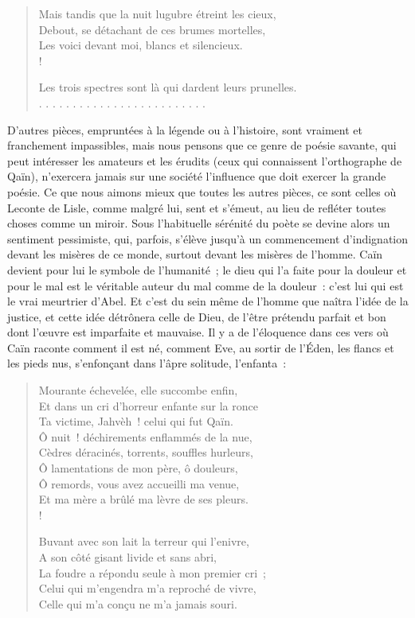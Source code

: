 \documentclass[french,twoside]{book} %
\begin{document}
\begin{verse}
Mais tandis que la nuit lugubre étreint les cieux,\\
Debout, se détachant de ces brumes mortelles,\\
Les voici devant moi, blancs et silencieux.\\!

Les trois spectres sont là qui dardent leurs prunelles.\\
. . . . . . . . . . . . . . . . . . . . . . . . .\\
\end{verse}

\noindent D’autres pièces, empruntées à la légende ou à l’histoire, sont vraiment et franchement impassibles, mais nous pensons que ce genre de poésie savante, qui peut intéresser les amateurs et les érudits (ceux qui connaissent l’orthographe de Qaïn), n’exercera jamais sur une société l’influence que doit exercer la grande poésie. Ce que nous aimons mieux que toutes les autres pièces, ce sont celles où Leconte de Lisle, comme malgré lui, sent et s’émeut, au lieu de refléter toutes choses comme un miroir. Sous l’habituelle sérénité du poète se devine alors un sentiment pessimiste, qui, parfois, s’élève jusqu’à un commencement d’indignation devant les misères de ce monde, surtout devant les misères de l’homme. Caïn devient pour lui le symbole de l’humanité ; le dieu qui l’a faite pour la douleur et pour le mal est le véritable auteur du mal comme de la douleur : c’est lui qui est le vrai meurtrier d’Abel. Et c’est du sein même de l’homme que naîtra l’idée de la justice, et cette idée détrônera celle de Dieu, de l’être prétendu parfait et bon dont l’œuvre est imparfaite et mauvaise. Il y a de l’éloquence dans ces vers où Caïn raconte comment il est né, comment Eve, au sortir de l’Éden, les flancs et les pieds nus, s’enfonçant dans l’âpre solitude, l’enfanta :\par


\begin{verse}
Mourante échevelée, elle succombe enfin,\\
Et dans un cri d’horreur enfante sur la ronce\\
Ta victime, Jahvèh ! celui qui fut Qaïn.\\
Ô nuit ! déchirements enflammés de la nue,\\
Cèdres déracinés, torrents, souffles hurleurs,\\
Ô lamentations de mon père, ô douleurs,\\
Ô remords, vous avez accueilli ma venue,\\
Et ma mère a brûlé ma lèvre de ses pleurs.\\!

Buvant avec son lait la terreur qui l’enivre,\\
A son côté gisant livide et sans abri,\\
La foudre a répondu seule à mon premier cri ;\\
Celui qui m’engendra m’a reproché de vivre,\\
Celle qui m’a conçu ne m’a jamais souri.\\
\end{verse}
\end{document}
